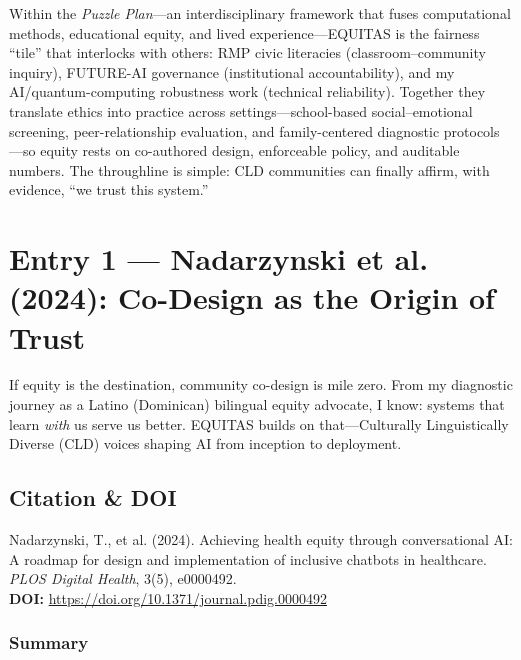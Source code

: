 \documentclass[11pt,twoside]{article}
\begin{document}
\vspace{0.2cm}
\noindent Within the \textit{Puzzle Plan}---an interdisciplinary framework that fuses computational methods, educational equity, and lived experience---\textsc{EQUITAS} is the fairness ``tile'' that interlocks with others: RMP civic literacies (classroom--community inquiry), FUTURE\mbox{-}AI governance (institutional accountability), and my AI/quantum-computing robustness work (technical reliability). Together they translate ethics into practice across settings---school-based social--emotional screening, peer-relationship evaluation, and family-centered diagnostic protocols---so equity rests on co-authored design, enforceable policy, and auditable numbers. The throughline is simple: CLD communities can finally affirm, with evidence, ``we trust this system.''

\newpage
\section*{Entry 1 --- Nadarzynski et al. (2024): Co-Design as the Origin of Trust}

{
\vspace{-0.3cm}
If equity is the destination, community co-design is mile zero. From my diagnostic journey as a Latino (Dominican) bilingual equity advocate, I know: systems that learn \emph{with} us serve us better. EQUITAS builds on that---Culturally Linguistically Diverse (CLD) voices shaping AI from inception to deployment.}

\vspace{-0.3cm}
\subsection*{Citation \& DOI}

\vspace{-0.3cm}
Nadarzynski, T., et al. (2024). Achieving health equity through conversational AI: A roadmap for design and implementation of inclusive chatbots in healthcare. \textit{PLOS Digital Health}, 3(5), e0000492. \\
\textbf{DOI:} \href{https://doi.org/10.1371/journal.pdig.0000492}{https://doi.org/10.1371/journal.pdig.0000492}

\vspace{-0.3cm}
\subsubsection*{Summary}
\end{document}
